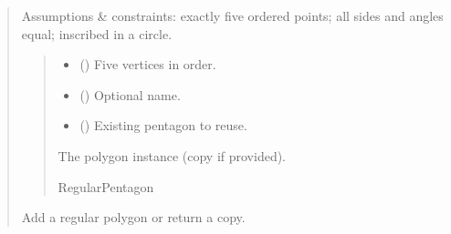 \documentclass[letterpaper,10pt,english]{sphinxmanual}
\begin{document}
\begin{quote}
\begin{fulllineitems}
\begin{fulllineitems}
\sphinxAtStartPar
Assumptions \& constraints: exactly five ordered points; all sides and
angles equal; inscribed in a circle.
\begin{quote}\begin{description}
\begin{itemize}
\item {} 
\sphinxAtStartPar
{} () \textendash{} Five vertices in order.

\item {} 
\sphinxAtStartPar
{} (\sphinxstyleliteralemphasis{\sphinxupquote{ | }}) \textendash{} Optional name.

\item {} 
\sphinxAtStartPar
{} (\sphinxstyleliteralemphasis{\sphinxupquote{ | }}) \textendash{} Existing pentagon to reuse.

\end{itemize}

\sphinxAtStartPar
The polygon instance (copy if provided).

\sphinxAtStartPar
RegularPentagon

\end{description}\end{quote}

\end{fulllineitems}


\begin{fulllineitems}
\label{\detokenize{pygeox:pygeox.add_objects.AddNamespace.regular_polygon}}
\pysigstartsignatures
\pysiglinewithargsret
{}
{\sphinxparamcomma {}\sphinxparamcomma {}}
{}
\pysigstopsignatures
\sphinxAtStartPar
Add a regular polygon or return a copy.


\end{fulllineitems}
\end{fulllineitems}
\end{quote}
\end{document}
